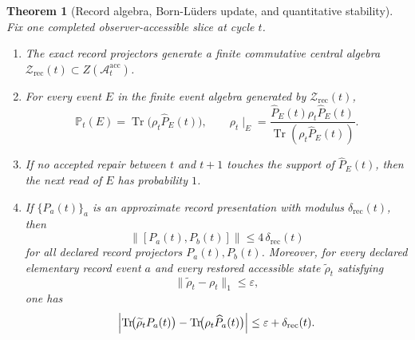 \documentclass[11pt]{article}
\newtheorem{theorem}{Theorem}[section]
\theoremstyle{remark}
\theoremstyle{plain}
\begin{document}
\begin{theorem}[Record algebra, Born-L\"uders update, and quantitative stability]\label{thm:crdt}
Fix one completed observer-accessible slice at cycle \(t\).
\begin{enumerate}
\item The exact record projectors generate a finite commutative central algebra
\(\mathcal Z_{\mathrm{rec}}(t)\subset Z(\mathcal A_t^{\mathrm{acc}})\).
\item For every event \(E\) in the finite event algebra generated by \(\mathcal Z_{\mathrm{rec}}(t)\),
\[
\mathbb P_t(E)=\operatorname{Tr}\!\bigl(\rho_t \widehat P_E(t)\bigr),
\qquad
\rho_t\!\mid_E
=
\frac{\widehat P_E(t)\rho_t \widehat P_E(t)}
{\operatorname{Tr}(\rho_t \widehat P_E(t))}.
\]
\item If no accepted repair between \(t\) and \(t+1\) touches the support of \(\widehat P_E(t)\),
then the next read of \(E\) has probability \(1\).
\item If \(\{P_a(t)\}_a\) is an approximate record presentation with modulus
\(\delta_{\mathrm{rec}}(t)\), then
\[
\|[P_a(t),P_b(t)]\|\le 4\,\delta_{\mathrm{rec}}(t)
\]
for all declared record projectors \(P_a(t),P_b(t)\). Moreover, for every declared elementary
record event \(a\) and every restored accessible state \(\widetilde\rho_t\) satisfying
\[
\|\widetilde\rho_t-\rho_t\|_1\le \varepsilon,
\]
one has
\[
\Bigl|
\operatorname{Tr}\!\bigl(\widetilde\rho_t P_a(t)\bigr)
-
\operatorname{Tr}\!\bigl(\rho_t \widehat P_a(t)\bigr)
\Bigr|
\le
\varepsilon+\delta_{\mathrm{rec}}(t).
\]
\end{enumerate}
\end{theorem}
\end{document}
